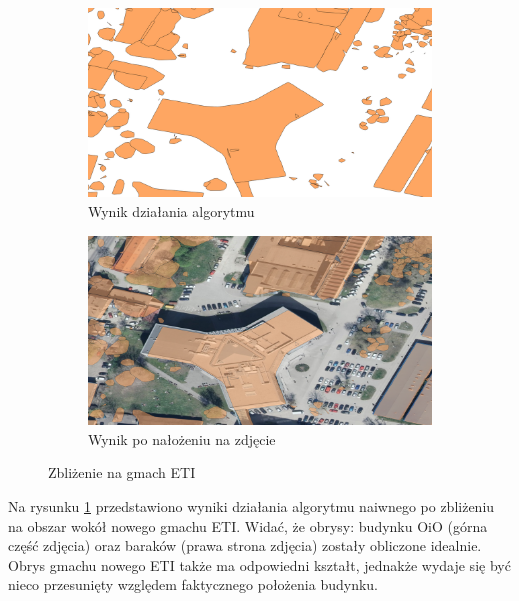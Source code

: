 \begin{figure}[h!]
    \centering
    \begin{subfigure}[b]{0.5\linewidth}
        \includegraphics[width=\linewidth]{img/wynik_naiwny_eti.png}
        \caption{Wynik działania algorytmu}
    \end{subfigure}%
    \begin{subfigure}[b]{0.5\linewidth}
        \includegraphics[width=\linewidth]{img/wynik_naiwny_eti_real.png}
        \caption{Wynik po nałożeniu na zdjęcie}
    \end{subfigure}%
    \caption{Zbliżenie na gmach ETI}
    \label{fig:wynik_naiwny_eti}
\end{figure}

Na rysunku \ref{fig:wynik_naiwny_eti} przedstawiono wyniki działania algorytmu naiwnego po
zbliżeniu na obszar wokół nowego gmachu ETI. Widać, że obrysy: budynku OiO (górna część zdjęcia)
oraz baraków (prawa strona zdjęcia) zostały obliczone idealnie. Obrys gmachu nowego ETI także ma
odpowiedni kształt, jednakże wydaje się być nieco przesunięty względem faktycznego położenia budynku.


